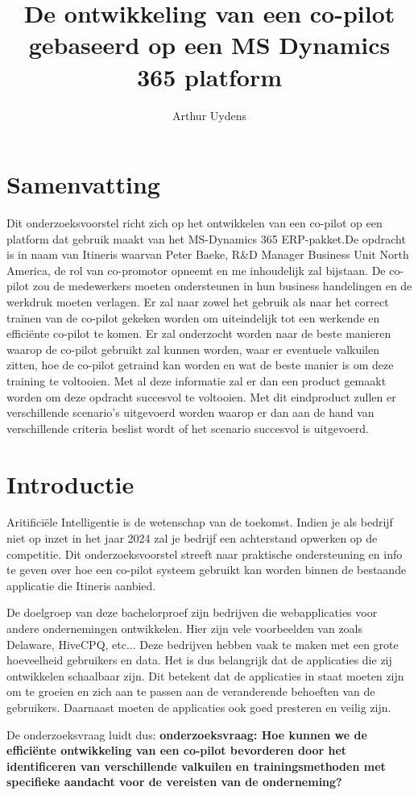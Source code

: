 \documentclass{hogent-article}
\title{De ontwikkeling van een co-pilot gebaseerd op een MS Dynamics 365 platform}
\author{Arthur Uydens }
\begin{document}
\section{Samenvatting}
Dit onderzoeksvoorstel richt zich op het ontwikkelen van een co-pilot op een platform dat gebruik maakt van het MS-Dynamics 365 ERP-pakket.De opdracht is in naam van Itineris waarvan Peter Baeke, R&D Manager Business Unit North America, de rol van co-promotor opneemt en me inhoudelijk zal bijstaan. De co-pilot zou de medewerkers moeten ondersteunen in hun business handelingen en de werkdruk moeten verlagen. Er zal naar zowel het gebruik als naar het correct trainen van de co-pilot gekeken worden om uiteindelijk tot een werkende en efficiënte co-pilot te komen. Er zal onderzocht worden naar de beste manieren waarop de co-pilot gebruikt zal kunnen worden, waar er eventuele valkuilen zitten, hoe de co-pilot getraind kan worden en wat de beste manier is om deze training te voltooien. Met al deze informatie zal er dan een product gemaakt worden om deze opdracht succesvol te voltooien. Met dit eindproduct zullen er verschillende scenario's uitgevoerd worden waarop er dan aan de hand van verschillende criteria beslist wordt of het scenario succesvol is uitgevoerd.

\section{Introductie}
Aritificiële Intelligentie is de wetenschap van de toekomst. Indien je als bedrijf niet op inzet in het jaar 2024 zal je bedrijf een achterstand opwerken op de competitie. Dit onderzoeksvoorstel streeft naar praktische ondersteuning en info te geven over hoe een co-pilot systeem gebruikt kan worden binnen de bestaande applicatie die Itineris aanbied.  

De doelgroep van deze bachelorproef zijn bedrijven die webapplicaties voor andere ondernemingen ontwikkelen. Hier zijn vele voorbeelden van zoals Delaware, HiveCPQ, etc... Deze bedrijven hebben vaak te maken met een grote hoeveelheid gebruikers en data. Het is dus belangrijk dat de applicaties die zij ontwikkelen schaalbaar zijn. Dit betekent dat de applicaties in staat moeten zijn om te groeien en zich aan te passen aan de veranderende behoeften van de gebruikers. Daarnaast moeten de applicaties ook goed presteren en veilig zijn.

De onderzoeksvraag luidt dus: \textbf{
  onderzoeksvraag: Hoe kunnen we de efficiënte ontwikkeling van een co-pilot bevorderen door het identificeren van verschillende valkuilen en trainingsmethoden met specifieke aandacht voor de vereisten van de onderneming? 
}
\end{document}

